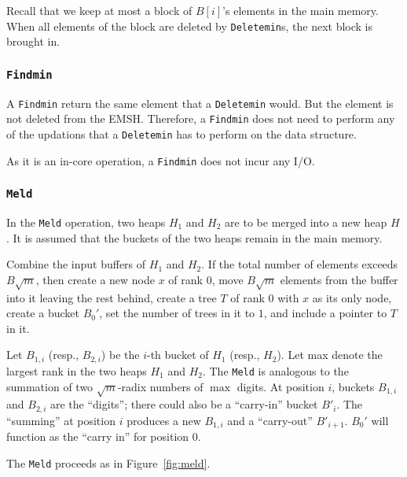 Recall that we keep at most a block of $B[i]$'s elements in the main memory.
When all elements of the block are deleted by {\tt Deletemin}s, the next block is
	brought in.

\subsubsection{{\tt Findmin}}
A {\tt Findmin} return the same element that a {\tt Deletemin} would.
But the element is not deleted from the EMSH. 
Therefore, a {\tt Findmin} does not need to perform any of the updations
that a {\tt Deletemin} has to perform on the data structure.

As it is an in-core operation, a {\tt Findmin} does not incur any I/O. 

\subsubsection{{\tt Meld}}

In the {\tt Meld} operation, two heaps $H_1$ and $H_2$ are to be merged
        into a new heap $H$.
It is assumed that the buckets of the two heaps remain in the main memory.

Combine the input buffers of $H_1$ and $H_2$.
If the total number of elements exceeds $B\sqrt{m}$, then
create a new node $x$ of rank $0$, move $B\sqrt{m}$ elements from the buffer into it
leaving the rest behind, create a tree $T$ of rank $0$ with $x$ as its only node, 
create a bucket $B_0'$, set the number of trees in it to $1$, and include a pointer to $T$ in it.

Let $B_{1,i}$ (resp., $B_{2,i}$) be the $i$-th bucket of $H_1$ (resp., $H_2$).
Let max denote the largest rank in the two heaps $H_1$ and $H_2$. The {\tt Meld} is analogous to
the summation of two $\sqrt{m}$-radix numbers of $\max$ digits. At position $i$,
buckets $B_{1,i}$ and $B_{2,i}$ are the ``digits''; there could also be
a ``carry-in'' bucket $B'_{i}$. The ``summing'' at position $i$ produces a new
$B_{1,i}$ and a ``carry-out'' $B'_{i+1}$. 
$B_0'$ will function as the ``carry in'' for position $0$.

The {\tt Meld} proceeds as in Figure~\ref{fig:meld}.

